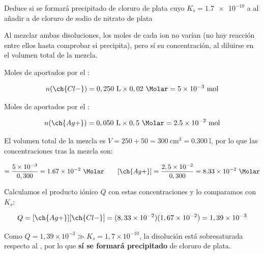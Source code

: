 \begin{exercise}
    Deduce si se formará precipitado de cloruro de plata cuyo \(K_s = \num{1.7e-10}\) a  al añadir a  de cloruro de sodio   de nitrato de plata 
    \begin{solu}

        Al mezclar ambas disoluciones, los moles de cada ion no varían (no hay reacción entre ellos hasta comprobar si precipita), pero sí su concentración, al diluirse en el volumen total de la mezcla.

        Moles de  aportados por el :

        \begin{equation*}
            n(\ch{Cl-}) = 0,250 \ \si{\litre} \times 0,02 \ \si{\Molar} = \num{5e-3} \ \text{mol}
        \end{equation*}

        Moles de  aportados por el :

        \begin{equation*}
            n(\ch{Ag+}) = 0,050 \ \si{\litre} \times 0,5 \ \si{\Molar} = \num{2.5e-2} \ \text{mol}
        \end{equation*}

        El volumen total de la mezcla es \(V = 250 + 50 = \SI{300}{\centi\metre\cubed} = \SI{0.300}{\litre}\), por lo que las concentraciones tras la mezcla son:

        \begin{equation*}
            [\ch{Cl-}] = \dfrac{5 \times 10^{-3}}{0,300} = \num{1.67e-2} \ \si{\Molar} \qquad [\ch{Ag+}] = \dfrac{2,5 \times 10^{-2}}{0,300} = \num{8.33e-2} \ \si{\Molar}
        \end{equation*}

        Calculamos el producto iónico \(Q\) con estas concentraciones y lo comparamos con \(K_s\):

        \begin{equation*}
            Q = [\ch{Ag+}][\ch{Cl-}] = (8,33 \times 10^{-2})(1,67 \times 10^{-2}) = 1,39 \times 10^{-3}
        \end{equation*}

        Como \(Q = 1,39 \times 10^{-3} \gg K_s = 1,7 \times 10^{-10}\), la disolución está sobresaturada respecto al , por lo que \textbf{sí se formará precipitado} de cloruro de plata.

    \end{solu}
\end{exercise}

